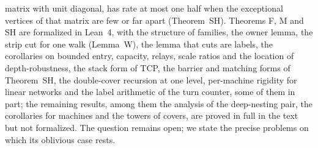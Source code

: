 matrix with unit diagonal, has rate at most one half when the exceptional vertices of that matrix are few or far apart
(Theorem~SH). Theorems F, M and SH are formalized in Lean~4, with the structure of families, the owner lemma, the strip cut
for one walk (Lemma~W), the lemma that cuts are labels, the corollaries on bounded entry, capacity, relays, scale ratios and
the location of depth-robustness, the stack form of TCP, the barrier and matching forms of Theorem~SH, the double-cover
recursion at one level, per-machine rigidity for linear networks and the label arithmetic of the turn counter, some of them in
part; the remaining results, among them the analysis of the deep-nesting pair, the corollaries for machines and the towers of
covers, are proved in full in the text but not formalized. The question remains open; we state the precise problems on which
its oblivious case rests.
